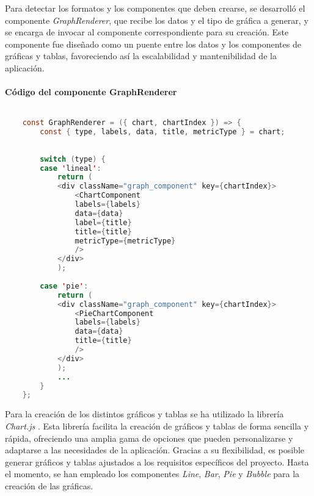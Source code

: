 Para detectar los formatos y los componentes que deben crearse, se desarrolló el componente \textit{GraphRenderer}, que recibe los datos y el 
tipo de gráfica a generar, y se encarga de invocar al componente correspondiente para su creación. Este componente fue diseñado como un puente 
entre los datos y los componentes de gráficas y tablas, favoreciendo así la escalabilidad y mantenibilidad de la aplicación.


\paragraph{Código del componente GraphRenderer}
\begin{lstlisting}[language=Java]
    
    const GraphRenderer = ({ chart, chartIndex }) => {
        const { type, labels, data, title, metricType } = chart;
    
    
        switch (type) {
        case 'lineal':
            return (
            <div className="graph_component" key={chartIndex}>
                <ChartComponent
                labels={labels}
                data={data}
                label={title}
                title={title}
                metricType={metricType}
                />
            </div>
            );
    
        case 'pie':
            return (
            <div className="graph_component" key={chartIndex}>
                <PieChartComponent
                labels={labels}
                data={data}
                title={title}
                />
            </div>
            );
            ...
        }
    };
\end{lstlisting}


Para la creación de los distintos gráficos y tablas se ha utilizado la librería \textit{Chart.js} \cite{ChartJS}. Esta librería 
facilita la creación de gráficos y tablas de forma sencilla y rápida, ofreciendo una amplia gama de opciones que pueden 
personalizarse y adaptarse a las necesidades de la aplicación. Gracias a su flexibilidad, es posible generar gráficos y 
tablas ajustados a los requisitos específicos del proyecto. Hasta el momento, se han empleado los componentes \textit{Line}, 
\textit{Bar}, \textit{Pie} y \textit{Bubble} para la creación de las gráficas.


